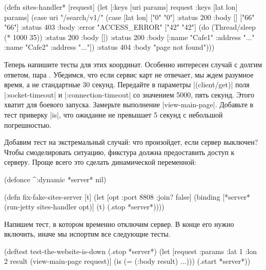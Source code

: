 \begin{english}
  \begin{clojure}
(defn sites-handler* [request]
  (let [{:keys [uri params]} request
        {:keys [lat lon]} params]
    (case uri
      "/search/v1/"
      (case [lat lon]
        ["0" "0"]   {:status 200 :body []}
        ["66" "66"] {:status 403 :body {:error "ACCESS_ERROR"}}
        ["42" "42"] (do (Thread/sleep (* 1000 35))
                        {:status 200 :body []})
        {:status 200
         :body [{:name "Cafe1" :address "..."}
                {:name "Cafe2" :address "..."}]})
      {:status 404 :body "page not found"})))
  \end{clojure}
\end{english}

Теперь напишите тесты для этих координат. Особенно интересен случай с долгим
ответом, пара . Убедимся, что если сервис карт не
отвечает, мы ждем разумное время, а не стандартные 30 секунд. Передайте в
параметры \spverb|(client/get)| поля \spverb|:socket-timeout| и
\spverb|:connection-timeout| со значением 5000, пять секунд. Этого хватит для
боевого запуска. Замерьте выполнение \spverb|view-main-page|. Добавьте в тест
приверку \spverb|is|, что ожидание не превышает 5 секунд с небольшой
погрешностью.

Добавим тест на экстремальный случай: что произойдет, если сервер выключен?
Чтобы смоделировать ситуацию, фикстура должна предоставить доступ к
серверу. Проще всего это сделать динамической переменной:

\begin{english}
  \begin{clojure}
(defonce ^:dynamic *server* nil)

(defn fix-fake-sites-server [t]
  (let [opt {:port 8808 :join? false}]
    (binding [*server* (run-jetty sites-handler opt)]
      (t)
      (.stop *server*))))
  \end{clojure}
\end{english}

Напишем тест, в котором временно отключим сервер. В конце его нужно включить,
иначе мы испортим все следующие тесты.

\begin{english}
  \begin{clojure}
(deftest test-the-website-is-down
  (.stop *server*)
  (let [request {:params {:lat 1 :lon 2}}
        result (view-main-page request)]
    (is (= (:body result) {...})))
  (.start *server*))
  \end{clojure}
\end{english}

